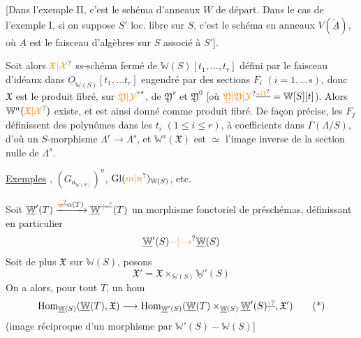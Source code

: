 [Dans l'exemple II, c'est le schéma d'anneaux $W$ de départ. Dans le cas de l'exemple I,  si   on suppose $S'$  loc. libre sur $S$, c'est le  schéma en anneaux $V(\check{\underline A})$, où $\underline A$ est le faisceau d'algèbres sur $S$ associé à $S'$].

Soit alors $\unsure{\mathfrak X|\mathcal X}$ ss-schéma fermé de $\mathbb W(S)[t_1,\ldots,t_r]$ défini par  le faisceau d'idéaux dans  $\underline O_{\mathbb W(S)}[t_1,\ldots t_r]$ engendré par des sections $F_i$ $(i=1,\ldots s)$, donc $\mathfrak X$ est le produit fibré, sur $\unsure{\mathfrak Y|\mathcal Y}^s$, de $\mathfrak Y^r$ et $\mathfrak Y^0$ [où $\unsure{\underline{\mathfrak Y}|\mathfrak Y|\mathcal Y}\deleted{^{\unsure{*|1}}}=\mathbb W[S][t]$).
Alors $\mathbb W^a(\unsure{\mathfrak X|\mathcal X})$ existe, et est ainsi donné comme produit fibré. De façon précise, les $F_j$  définissent des polynômes dans les $t_i$ $(1\leq i\leq r)$, à coefficients dans  $\Gamma(\Lambda/S)$, d'où  un $S$-morphisme $\Lambda^r\longrightarrow\Lambda^s$, et $\mathbb W^a(\mathfrak X)$ est $\simeq$ l'image inverse de la section nulle de $\Lambda^s$.

\uline{Exemples} , $(G_{a_{\underline{\mathbb W}(S)}})^n$, $\mathrm{Gl}(\unsure{m|n})_{\mathbb W(S)}$, etc.

Soit $\underline{\mathbb W}'(T)\xrightarrow{\deleted{\unsure{\varphi}}\alpha(T)}\underline{\mathbb W}^{\deleted{\unsure{'|*}}}(T)$ un morphisme fonctoriel de préschémas, définissant en particulier
\[
 \underline{\mathbb W}'(S)\unsure{-|\to}\underline{\mathbb W}(S)
\]
Soit de plus $\mathfrak X$ sur $\mathbb W(S)$, posons
\[
 \mathfrak X'=\mathfrak X\times_{\underline{\mathbb W}(S)}\underline{\mathbb W}'(S)
\]
On a alors, pour tout $T$, un hom 
\[
 \mathrm{Hom}_{\underline{\mathbb W}(S)}(\underline{\mathbb W}(T),\mathfrak X)\longrightarrow\mathrm{Hom}_{\underline{\mathbb W}'(S)}(\underline{\mathbb W}(T)\times_{\underline{\mathbb W}(S)}\underline{\mathbb W}'(S)\deleted{\unsure{)}},\mathfrak X')\tag*{(*)}
\]
(image réciproque d'un morphisme par $\mathbb W'(S)-\mathbb W(S)$]


